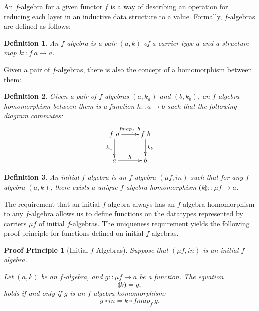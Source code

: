 \documentclass{jfp1}
\newcommand{\fold}[1]{\llparenthesis #1 \rrparenthesis}
\newtheorem{definition}{Definition}
\newtheorem{proofprinciple}{Proof Principle}
\begin{document}
An $f$-algebra for a given functor $f$ is a way of describing an
operation for reducing each layer in an inductive data structure to a
value. Formally, $f$-algebras are defined as follows:
\begin{definition}
  An \emph{$f$-algebra} is a pair $(a, k)$ of a
  \emph{carrier type} $a$ and a \emph{structure map}
  $k :: f~a \to a$.
\end{definition}
Given a pair of $f$-algebras, there is also the concept of a
homomorphism between them:
\begin{definition}
  Given a pair of $f$-algebras $(a,k_a)$ and $(b, k_b)$, an
  \emph{$f$-algebra homomorphism} between them is a function $h :: a
  \to b$ such that the following diagram commutes:
  \begin{equation}
    \label{eq:falgebra-homomorphism}
    \xymatrix{
      {f~a} \ar[r]^{\mathit{fmap}_f~h} \ar[d]_{k_a}
      &
      {f~b} \ar[d]^{k_b}
      \\
      {a} \ar[r]^h
      &
      {b}
    }
  \end{equation}


\end{definition}

\begin{definition}
  An \emph{initial $f$-algebra} is an $f$-algebra $(\mu \! f,
  \mathit{in})$ such that for any $f$-algebra $(a, k)$, there exists
  a unique $f$-algebra homomorphism $\fold{k} :: \mu f \to a$.
\end{definition}

The requirement that an initial $f$-algebra always has an $f$-algebra
homomorphism to any $f$-algebra allows us to define functions on the
datatypes represented by carriers $\mu \! f$ of initial
$f$-algebras. The uniqueness requirement yields the following proof
principle for functions defined on initial $f$-algebras.

\begin{proofprinciple}[Initial $f$-Algebras]\label{pp:initial-alg}
  Suppose that $(\mu f, \mathit{in})$ is an initial $f$-algebra.

  Let $(a, k)$ be an $f$-algebra, and $g :: \mu f \to
  a$ be a function. The equation
  \begin{displaymath}
    \fold{k} = g,
  \end{displaymath}
  holds if and only if $g$ is an $f$-algebra homomorphism:
  \begin{displaymath}
    g \circ \mathit{in} = k \circ \mathit{fmap}_f~g.
  \end{displaymath}
\end{proofprinciple}
\end{document}
